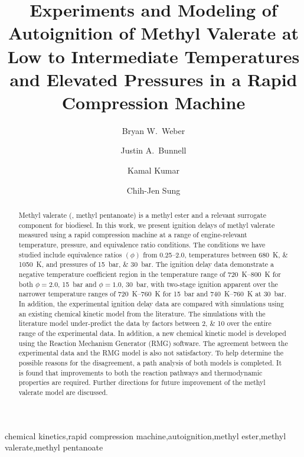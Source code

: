 \documentclass[letterpaper, review, sort&compress]{elsarticle}
\begin{document}
\begin{frontmatter}
\title{ Experiments and Modeling of Autoignition of Methyl Valerate at Low to Intermediate Temperatures and Elevated Pressures in a Rapid Compression Machine }

\author[uconn]{Bryan W.\ Weber}
\author[uconn]{Justin A.\ Bunnell}
\author[idaho]{Kamal Kumar}
\author[uconn]{Chih-Jen Sung}
\address[uconn]{Department of Mechanical Engineering, University of Connecticut, Storrs, CT, USA}
\address[idaho]{Department of Mechanical Engineering, University of Idaho, Moscow, ID, USA}

\begin{abstract} %

    Methyl valerate (, methyl pentanoate) is a methyl ester and a relevant surrogate
    component for biodiesel. In this work, we present ignition delays of methyl valerate measured
    using a rapid compression machine at a range of engine-relevant temperature, pressure, and
    equivalence ratio conditions. The conditions we have studied include equivalence ratios
    \((\phi)\) from \numrange{0.25}{2.0}, temperatures between \SIlist{680;1050}{\K}, and pressures
    of \SIlist{15;30}{\bar}. The ignition delay data demonstrate a negative temperature coefficient
    region in the temperature range of \SIrange[range-phrase={--}]{720}{800}{\K} for both
    \(\phi=2.0\), \SI{15}{\bar} and \(\phi=1.0\), \SI{30}{\bar}, with two-stage ignition apparent
    over the narrower temperature ranges of \SIrange[range-phrase={--}]{720}{760}{\K} for
    \SI{15}{\bar} and \SIrange[range-phrase={--}]{740}{760}{\K} at \SI{30}{\bar}. In addition, the
    experimental ignition delay data are compared with simulations using an existing chemical
    kinetic model from the literature. The simulations with the literature model under-predict the
    data by factors between \numlist{2;10} over the entire range of the experimental data. In
    addition, a new chemical kinetic model is developed using the Reaction Mechanism Generator (RMG)
    software. The agreement between the experimental data and the RMG model is also not
    satisfactory. To help determine the possible reasons for the disagreement, a path analysis of
    both models is completed. It is found that improvements to both the reaction pathways and
    thermodynamic properties are required. Further directions for future improvement of the methyl
    valerate model are discussed.

\end{abstract}

\begin{keyword}
    chemical kinetics\sep rapid compression machine\sep autoignition\sep methyl ester\sep methyl valerate\sep methyl pentanoate
\end{keyword}
\end{frontmatter}
\end{document}
